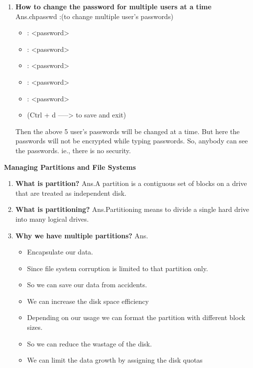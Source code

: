 \begin{enumerate}
\begin{enumerate}
    \item \textbf{How to change the password for multiple  users  at a time}
    \newline
    Ans.chpasswd :(to change multiple user's  passwords)
         \begin{itemize}
          \item <user name 1> : <password>
          \item  <user name 2> : <password>
          \item  <user name 3> : <password>
          \item <user name 4> : <password>
          \item <user name 5> : <password>
          \item (Ctrl + d    ----->   to save and exit)
	       \end{itemize}
        Then  the above 5 user's passwords will be changed at a time. But here the passwords will not be encrypted while typing passwords. So, anybody can see the passwords.  ie., there is no security.
\end{enumerate}     
    \bigskip
    \bigskip
    \bigskip 

\textbf{Managing Partitions and File Systems}
   
\bigskip

\begin{enumerate}
  \item \textbf{What is partition?}
  \newline
   Ans.A partition is a contiguous set of blocks on a drive that are treated as independent disk. 
   
   \bigskip
   \bigskip
  
  \item \textbf{What is partitioning?}
  \newline
  Ans.Partitioning means to divide a single hard drive into many logical drives.

  \bigskip
  \bigskip

  \item \textbf{Why we have multiple partitions?}
  \newline
  Ans.\begin{itemize}
        \item Encapsulate our data.
        \item Since file system corruption is limited to that partition only.
        \item So we can save our data from accidents. 
        \item We can increase the disk space efficiency
        \item Depending on our usage we can format the partition with different block sizes.
        \item So we can reduce the wastage of the disk.
        \item We can limit the data growth by assigning the disk quotas
      \end{itemize}


\end{enumerate}
\end{enumerate}
